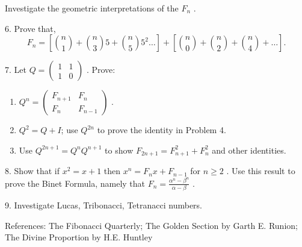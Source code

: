 \documentclass[10pt,]{book}
\theoremstyle{plain}
\theoremstyle{definition}
\theoremstyle{definition}
\theoremstyle{definition}
\numberwithin{equation}{chapter}
\newcommand{\amp}{&}
\begin{document}
\begin{exerciselist}
Investigate the geometric interpretations of the \(F_{n}\) .%
\par\smallskip
\item[6.]\hypertarget{exercise-23}{}\hypertarget{p-1767}{}%
Prove that,%
\begin{equation*}
F_{n} = \left\lbrack \binom{n}{1}  + \binom{n}{3} 5 + \binom{n}{5} 5^{2}\ldots \right\rbrack + \left\lbrack \binom{n}{0}  + \binom{n}{2}  + \binom{n}{4}  + \ldots \right\rbrack.
\end{equation*}
%
\par\smallskip
\item[7.]\hypertarget{exercise-24}{}\hypertarget{p-1768}{}%
Let \(Q =\begin{pmatrix}1 \amp 1 \\ 1 \amp 0\end{pmatrix}\) . Prove: \leavevmode%
\begin{enumerate}[label=(\alph*)]
\item\hypertarget{li-90}{}\hypertarget{p-1769}{}%
\(Q^{n} = \begin{pmatrix} F_{n + 1} \amp F_{n}\\ F_{n} \amp F_{n - 1} \end{pmatrix}\) .%
\item\hypertarget{li-91}{}\hypertarget{p-1770}{}%
\(Q^{2} = Q + I\); use \(Q^{2n}\) to prove the identity in Problem 4.%
\item\hypertarget{li-92}{}\hypertarget{p-1771}{}%
Use \(Q^{2n + 1} = Q^{n}Q^{n + 1}\) to show \(F_{2n + 1} = F_{n + 1}^{2} + F_{n}^{2}\) and other identities.%
\end{enumerate}
%
\par\smallskip
\item[8.]\hypertarget{exercise-25}{}\hypertarget{p-1772}{}%
Show that if \(x^{2} = x + 1\) then \(x^{n} = F_{n}x + F_{n - 1}\) for \(n \geq 2\) . Use this result to prove the Binet Formula, namely that \(F_{n} = \frac{\alpha^{n} - \beta^{n}}{\alpha - \beta}\) .%
\par\smallskip
\item[9.]\hypertarget{exercise-26}{}\hypertarget{p-1773}{}%
Investigate Lucas, Tribonacci, Tetranacci numbers.%
\par\smallskip
\end{exerciselist}
\bigbreak
\hypertarget{p-1774}{}%
References: The Fibonacci Quarterly; The Golden Section by Garth E. Runion; The Divine Proportion by H.E. Huntley%
\typeout{************************************************}
\typeout{************************************************}
\end{document}
